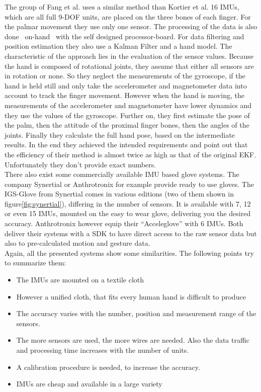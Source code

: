 The group of Fang et al. uses a similar method than Kortier et al. 16 \acp{IMU}, which are all full 9-\ac{DOF} units, are placed on the three bones of each finger. For the palmar movement they use only one sensor. The processing of the data is also done ~\grqq on-hand\grqq~ with the self designed processor-board. For data filtering and position estimation they also use a Kalman Filter and a hand model. The characteristic of the approach lies in the evaluation of the sensor values. Because the hand is composed of rotational joints, they assume that either all sensors are in rotation or none. So they neglect the measurements of the gyroscope, if the hand is held still and only take the accelerometer and magnetometer data into account to track the finger movement. However when the hand is moving, the measurements of the accelerometer and magnetometer have lower dynamics and they use the values of the gyroscope. Further on, they first estimate the pose of the palm, then the attitude of the proximal finger bones, then the angles of the joints. Finally they calculate the full hand pose, based on the intermediate results. In the end they achieved the intended requirements and point out that the efficiency of their method is almost twice as high as that of the original \ac{EKF}. Unfortunately they don't provide exact numbers.\\
There also exist some commercially available \ac{IMU} based glove systems. The company Synertial \cite{Synertial} or Anthrotronix \cite{anthrotronix} for example provide ready to use gloves. The IGS-Glove from Synertial comes in various editions (two of them shown in figure\ref{fig:synertial}), differing in the number of sensors. It is available with 7, 12 or even 15 \acp{IMU}, mounted on the easy to wear glove, delivering you the desired accuracy. Anthrotronix however equip their ``Acceleglove'' with 6 \acp{IMU}. Both deliver their systems with a \acs{SDK} to have direct access to the raw sensor data but also to pre-calculated motion and gesture data.\\

Again, all the presented systems show some similarities. The following points try to summarize them:
\begin{itemize}
\item The \acp{IMU} are mounted on a textile cloth
\item However a unified cloth, that fits every human hand is difficult to produce
\item The accuracy varies with the number, position and measurement range of the sensors.
\item The more sensors are used, the more wires are needed. Also the data traffic and processing time increases with the number of units.
\item A calibration procedure is needed, to increase the accuracy.
\item IMUs are cheap and available in a large variety
\end{itemize}

